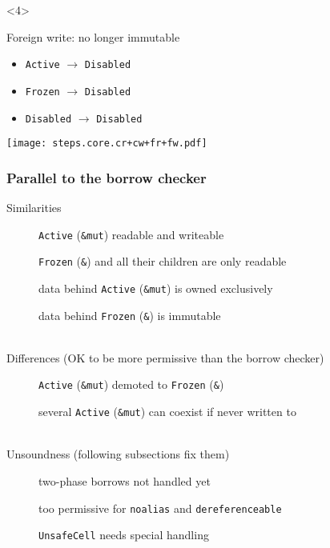 \begin{frame}[t]
    \begin{onlyenv}<4>
        \begin{block}{Foreign write: no longer immutable}
            \begin{itemize}
                \item \texttt{Active} \(\to\) \texttt{Disabled}
                \item \texttt{Frozen} \(\to\) \texttt{Disabled}
                \item \texttt{Disabled} \(\to\) \texttt{Disabled}
            \end{itemize}
        \end{block}
        \texttt{[image: steps.core.cr+cw+fr+fw.pdf]}
    \end{onlyenv}
\end{frame}

\begin{frame}
    \frametitle{Parallel to the borrow checker}
    Similarities
    \hspace{-5em}
    \begin{description}
        \item[\cmark] \texttt{Active} (\texttt{\&mut}) readable and writeable
        \item[\cmark] \texttt{Frozen} (\texttt{\&}) and all their children are only readable
        \item[\cmark] data behind \texttt{Active} (\texttt{\&mut}) is owned exclusively
        \item[\cmark] data behind \texttt{Frozen} (\texttt{\&}) is immutable
    \end{description}~\\

    Differences (OK to be more permissive than the borrow checker)
    \hspace{-5em}
    \begin{description}
        \item[\xmark] \texttt{Active} (\texttt{\&mut}) demoted to \texttt{Frozen} (\texttt{\&})
        \item[\xmark] several \texttt{Active} (\texttt{\&mut}) can coexist if never written to
    \end{description}~\\

    Unsoundness (following subsections fix them)
    \hspace{-5em}
    \begin{description}
        \item[\xmark] two-phase borrows not handled yet
        \item[\xmark] too permissive for \texttt{noalias} and \texttt{dereferenceable}
        \item[\xmark] \texttt{UnsafeCell} needs special handling
    \end{description}~\\

\end{frame}

